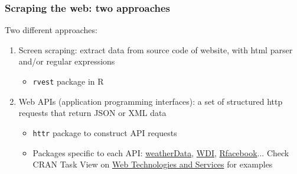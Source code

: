 \documentclass{beamer}
\begin{document}
\begin{frame}
	\frametitle{Scraping the web: two approaches}
	
	Two different approaches:
	\vspace{.25cm}
	\begin{enumerate}[<+->]
		\item \alert{Screen scraping}: extract data from source code of website, with html parser and/or regular expressions
		\begin{itemize}
			\item \texttt{rvest} package in R
		\end{itemize}
		\vspace{.25cm}
		\item \alert{Web APIs }(application programming interfaces): a set of structured http requests that return JSON or XML data
		\begin{itemize}
			\item \texttt{httr} package to construct API requests
			\item Packages specific to each API:  \href{https://cran.r-project.org/web/packages/weatherData/index.html}{weatherData}, \href{https://cran.r-project.org/web/packages/WDI/index.html}{WDI}, \href{https://cran.r-project.org/web/packages/Rfacebook/index.html}{Rfacebook}... Check CRAN Task View on \href{https://cran.r-project.org/web/views/WebTechnologies.html}{Web Technologies and Services} for examples

		\end{itemize}
	\end{enumerate}
\end{frame}
\end{document}
